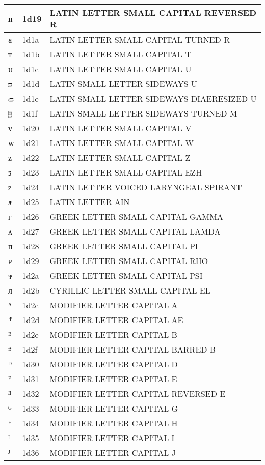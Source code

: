 \documentclass[12pt,letterpaper,openany]{book}
\begin{document}
\begin{center}
\begin{supertabular}{|m{0.25in}|m{0.5in}|m{4in}|}
ᴙ & 1d19 & LATIN LETTER SMALL CAPITAL REVERSED R\\\hline
ᴚ & 1d1a & LATIN LETTER SMALL CAPITAL TURNED R\\\hline
ᴛ & 1d1b & LATIN LETTER SMALL CAPITAL T\\\hline
ᴜ & 1d1c & LATIN LETTER SMALL CAPITAL U\\\hline
ᴝ & 1d1d & LATIN SMALL LETTER SIDEWAYS U\\\hline
ᴞ & 1d1e & LATIN SMALL LETTER SIDEWAYS DIAERESIZED U\\\hline
ᴟ & 1d1f & LATIN SMALL LETTER SIDEWAYS TURNED M\\\hline
ᴠ & 1d20 & LATIN LETTER SMALL CAPITAL V\\\hline
ᴡ & 1d21 & LATIN LETTER SMALL CAPITAL W\\\hline
ᴢ & 1d22 & LATIN LETTER SMALL CAPITAL Z\\\hline
ᴣ & 1d23 & LATIN LETTER SMALL CAPITAL EZH\\\hline
ᴤ & 1d24 & LATIN LETTER VOICED LARYNGEAL SPIRANT\\\hline
ᴥ & 1d25 & LATIN LETTER AIN\\\hline
ᴦ & 1d26 & GREEK LETTER SMALL CAPITAL GAMMA\\\hline
ᴧ & 1d27 & GREEK LETTER SMALL CAPITAL LAMDA\\\hline
ᴨ & 1d28 & GREEK LETTER SMALL CAPITAL PI\\\hline
ᴩ & 1d29 & GREEK LETTER SMALL CAPITAL RHO\\\hline
ᴪ & 1d2a & GREEK LETTER SMALL CAPITAL PSI\\\hline
ᴫ & 1d2b & CYRILLIC LETTER SMALL CAPITAL EL\\\hline
ᴬ & 1d2c & MODIFIER LETTER CAPITAL A\\\hline
ᴭ & 1d2d & MODIFIER LETTER CAPITAL AE\\\hline
ᴮ & 1d2e & MODIFIER LETTER CAPITAL B\\\hline
ᴯ & 1d2f & MODIFIER LETTER CAPITAL BARRED B\\\hline
ᴰ & 1d30 & MODIFIER LETTER CAPITAL D\\\hline
ᴱ & 1d31 & MODIFIER LETTER CAPITAL E\\\hline
ᴲ & 1d32 & MODIFIER LETTER CAPITAL REVERSED E\\\hline
ᴳ & 1d33 & MODIFIER LETTER CAPITAL G\\\hline
ᴴ & 1d34 & MODIFIER LETTER CAPITAL H\\\hline
ᴵ & 1d35 & MODIFIER LETTER CAPITAL I\\\hline
ᴶ & 1d36 & MODIFIER LETTER CAPITAL J\\\hline

\end{supertabular}
\end{center}
\end{document}
